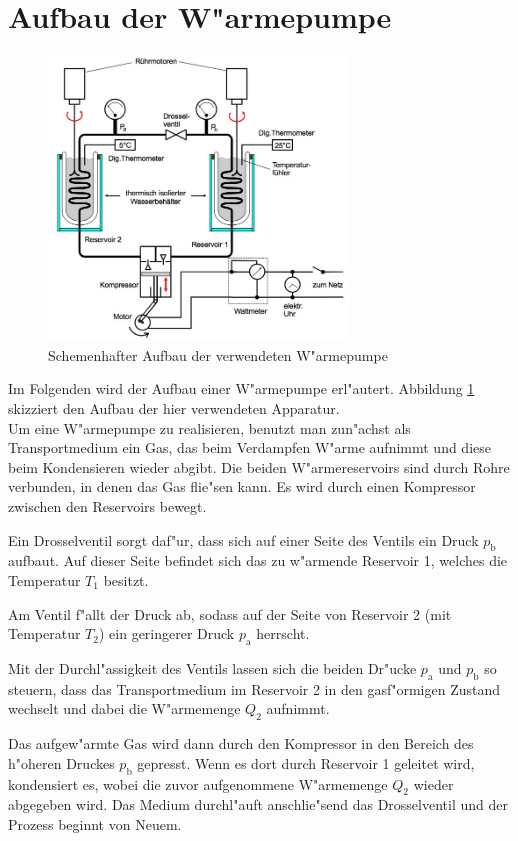 \section{Aufbau der W"armepumpe}
\label{sec:aufbau}
	\begin{figure}
		\centering
		\includegraphics[width = 8cm]{img/pumpe.jpeg}
		\caption{Schemenhafter Aufbau der verwendeten W"armepumpe \label{fig:pumpe}}
	\end{figure}

	Im Folgenden wird der Aufbau einer W"armepumpe erl"autert.
	Abbildung \ref{fig:pumpe} skizziert den Aufbau der hier verwendeten Apparatur. \\

	Um eine W"armepumpe zu realisieren, benutzt man zun"achst als Transportmedium ein Gas, das beim Verdampfen W"arme aufnimmt und diese beim Kondensieren wieder abgibt.
	Die beiden W"armereservoirs sind durch Rohre verbunden, in denen das Gas flie"sen kann.
	Es wird durch einen Kompressor zwischen den Reservoirs bewegt.

	Ein Drosselventil sorgt daf"ur, dass sich auf einer Seite des Ventils ein Druck $p_\mathrm{b}$ aufbaut.
	Auf dieser Seite befindet sich das zu w"armende Reservoir 1, welches die Temperatur $T_1$ besitzt.

	Am Ventil f"allt der Druck ab, sodass auf der Seite von Reservoir 2 (mit Temperatur $T_2$) ein geringerer Druck $p_\mathrm{a}$ herrscht.

	Mit der Durchl"assigkeit des Ventils lassen sich die beiden Dr"ucke $p_\mathrm{a}$ und $p_\mathrm{b}$ so steuern, dass das Transportmedium im Reservoir 2 in den gasf"ormigen Zustand wechselt und dabei die W"armemenge $Q_2$ aufnimmt.

	Das aufgew"armte Gas wird dann durch den Kompressor in den Bereich des h"oheren Druckes $p_\mathrm{b}$ gepresst.
	Wenn es dort durch Reservoir 1 geleitet wird, kondensiert es, wobei die zuvor aufgenommene W"armemenge $Q_2$ wieder abgegeben wird.
	Das Medium durchl"auft anschlie"send das Drosselventil und der Prozess beginnt von Neuem.

